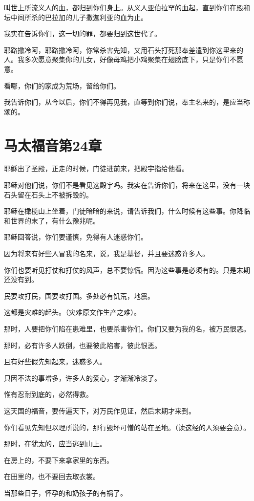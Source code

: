 \documentclass[12pt,oneside]{book}
\begin{document}
叫世上所流义人的血，都归到你们身上。从义人亚伯拉罕的血起，直到你们在殿和坛中间所杀的巴拉加的儿子撒迦利亚的血为止。

我实在告诉你们，这一切的罪，都要归到这世代了。

耶路撒冷阿，耶路撒冷阿，你常杀害先知，又用石头打死那奉差遣到你这里来的人。我多次愿意聚集你的儿女，好像母鸡把小鸡聚集在翅膀底下，只是你们不愿意。

看哪，你们的家成为荒场，留给你们。

我告诉你们，从今以后，你们不得再见我，直等到你们说，奉主名来的，是应当称颂的。

\chapter{马太福音第24章}
耶稣出了圣殿，正走的时候，门徒进前来，把殿宇指给他看。

耶稣对他们说，你们不是看见这殿宇吗。我实在告诉你们，将来在这里，没有一块石头留在石头上不被拆毁的。

耶稣在橄榄山上坐着，门徒暗暗的来说，请告诉我们，什么时候有这些事。你降临和世界的末了，有什么豫兆呢。

耶稣回答说，你们要谨慎，免得有人迷惑你们。

因为将来有好些人冒我的名来，说，我是基督，并且要迷惑许多人。

你们也要听见打仗和打仗的风声，总不要惊慌。因为这些事是必须有的。只是末期还没有到。

民要攻打民，国要攻打国。多处必有饥荒，地震。

这都是灾难的起头。（灾难原文作生产之难）。

那时，人要把你们陷在患难里，也要杀害你们。你们又要为我的名，被万民恨恶。

那时，必有许多人跌倒，也要彼此陷害，彼此恨恶。

且有好些假先知起来，迷惑多人。

只因不法的事增多，许多人的爱心，才渐渐冷淡了。

惟有忍耐到底的，必然得救。

这天国的福音，要传遍天下，对万民作见证，然后末期才来到。

你们看见先知但以理所说的，那行毁坏可憎的站在圣地。（读这经的人须要会意）。

那时，在犹太的，应当逃到山上。

在房上的，不要下来拿家里的东西。

在田里的，也不要回去取衣裳。

当那些日子，怀孕的和奶孩子的有祸了。
\end{document}
